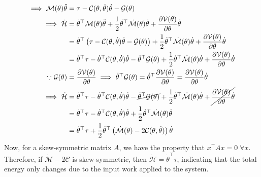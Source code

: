 \begin{align*}
    \implies
    \mathcal{M}(\theta) \ddot{\theta}
     & =
    \tau
    -
    \mathcal{C}(\theta, \dot{\theta}) \dot{\theta}
    -
    \mathcal{G}(\theta)
    \\
    \implies
    \dot{\mathcal{H}}
     & =
    \dot{\theta}^{\top} \mathcal{M}(\theta) \ddot{\theta}
    +
    \frac{1}{2}
    \dot{\theta}^{\top} \dot{\mathcal{M}}(\theta) \dot{\theta}
    +
    \frac{\partial \mathcal{V}(\theta)}{\partial \theta} \dot{\theta}
    \\
     & =
    \dot{\theta}^{\top} \left( \tau - \mathcal{C}(\theta, \dot{\theta}) \dot{\theta} - \mathcal{G}(\theta) \right)
    +
    \frac{1}{2}
    \dot{\theta}^{\top} \dot{\mathcal{M}}(\theta) \dot{\theta}
    +
    \frac{\partial \mathcal{V}(\theta)}{\partial \theta} \dot{\theta}
    \\ & =
    \dot{\theta}^{\top} \tau
    -
    \dot{\theta}^{\top} \mathcal{C}(\theta, \dot{\theta}) \dot{\theta}
    -
    \dot{\theta}^{\top} \mathcal{G}(\theta)
    +
    \frac{1}{2}
    \dot{\theta}^{\top} \dot{\mathcal{M}}(\theta) \dot{\theta}
    +
    \frac{\partial \mathcal{V}(\theta)}{\partial \theta} \dot{\theta}
    \\
    \because
    \mathcal{G}(\theta)
     & =
    \frac{\partial \mathcal{V}(\theta)}{\partial \theta}
    \implies
    \dot{\theta}^{\top} \mathcal{G}(\theta)
    =
    \dot{\theta}^{\top} \frac{\partial \mathcal{V}(\theta)}{\partial \theta}
    =
    \frac{\partial \mathcal{V}(\theta)}{\partial \theta} \dot{\theta}
    \\
    \implies
    \dot{\mathcal{H}}
     & =
    \dot{\theta}^{\top} \tau
    -
    \dot{\theta}^{\top} \mathcal{C}(\theta, \dot{\theta}) \dot{\theta}
    -
    \cancel{\dot{\theta}^{\top} \mathcal{G}(\theta)}
    +
    \frac{1}{2}
    \dot{\theta}^{\top} \dot{\mathcal{M}}(\theta) \dot{\theta}
    +
    \cancel{\frac{\partial \mathcal{V}(\theta)}{\partial \theta} \dot{\theta}}
    \\ & =
    \dot{\theta}^{\top} \tau
    -
    \dot{\theta}^{\top} \mathcal{C}(\theta, \dot{\theta}) \dot{\theta}
    +
    \frac{1}{2}
    \dot{\theta}^{\top} \dot{\mathcal{M}}(\theta) \dot{\theta}
    \\ & =
    \dot{\theta}^{\top} \tau
    +
    \frac{1}{2}
    \dot{\theta}^{\top} \left(
    \dot{\mathcal{M}}(\theta)
    -
    2 \mathcal{C}(\theta, \dot{\theta})
    \right)
    \dot{\theta}
\end{align*}
Now, for a skew-symmetric matrix \( A \), we have the property that \( x^\top A x = 0 \; \forall x \). \\
Therefore, if \( \dot{\mathcal{M}}-2 \mathcal{C} \) is skew-symmetric, then \( \boxed{ \dot{\mathcal{H}} = \dot{\theta}^{\top} \tau} \), indicating that the total energy only changes due to the input work applied to the system.
